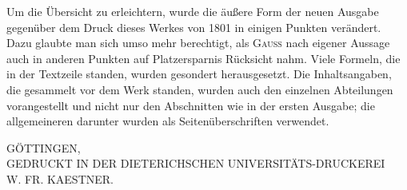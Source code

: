Um die Übersicht zu erleichtern, wurde die äußere Form der neuen Ausgabe gegenüber dem Druck dieses Werkes von 1801 in einigen Punkten verändert. Dazu glaubte man sich umso mehr berechtigt, als \textsc{Gauss} nach eigener Aussage auch in anderen Punkten auf Platzersparnis Rücksicht nahm. Viele Formeln, die in der Textzeile standen, wurden gesondert herausgesetzt. Die Inhaltsangaben, die gesammelt vor dem Werk standen, wurden auch den einzelnen Abteilungen vorangestellt und nicht nur den Abschnitten wie in der ersten Ausgabe; die allgemeineren darunter wurden als Seitenüberschriften verwendet.

\BookRule{45mm}

\begin{center}\small GÖTTINGEN,\\ GEDRUCKT IN DER DIETERICHSCHEN UNIVERSITÄTS-DRUCKEREI\\ W. FR. KAESTNER.\end{center}
